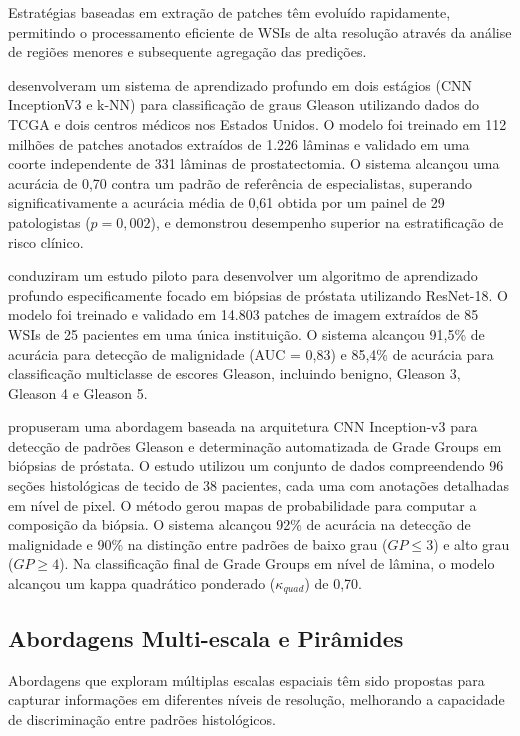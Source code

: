Estratégias baseadas em extração de patches têm evoluído rapidamente, permitindo o processamento eficiente de WSIs de alta resolução através da análise de regiões menores e subsequente agregação das predições.

\cite{ref-nagpal2019} desenvolveram um sistema de aprendizado profundo em dois estágios (CNN InceptionV3 e k-NN) para classificação de graus Gleason utilizando dados do TCGA e dois centros médicos nos Estados Unidos. O modelo foi treinado em 112 milhões de patches anotados extraídos de 1.226 lâminas e validado em uma coorte independente de 331 lâminas de prostatectomia. O sistema alcançou uma acurácia de 0,70 contra um padrão de referência de especialistas, superando significativamente a acurácia média de 0,61 obtida por um painel de 29 patologistas ($p = 0,002$), e demonstrou desempenho superior na estratificação de risco clínico.

\cite{ref-kott2019} conduziram um estudo piloto para desenvolver um algoritmo de aprendizado profundo especificamente focado em biópsias de próstata utilizando ResNet-18. O modelo foi treinado e validado em 14.803 patches de imagem extraídos de 85 WSIs de 25 pacientes em uma única instituição. O sistema alcançou 91,5\% de acurácia para detecção de malignidade (AUC = 0,83) e 85,4\% de acurácia para classificação multiclasse de escores Gleason, incluindo benigno, Gleason 3, Gleason 4 e Gleason 5.

\cite{ref-lucas2019} propuseram uma abordagem baseada na arquitetura CNN Inception-v3 para detecção de padrões Gleason e determinação automatizada de Grade Groups em biópsias de próstata. O estudo utilizou um conjunto de dados compreendendo 96 seções histológicas de tecido de 38 pacientes, cada uma com anotações detalhadas em nível de pixel. O método gerou mapas de probabilidade para computar a composição da biópsia. O sistema alcançou 92\% de acurácia na detecção de malignidade e 90\% na distinção entre padrões de baixo grau ($GP \le 3$) e alto grau ($GP \ge 4$). Na classificação final de Grade Groups em nível de lâmina, o modelo alcançou um kappa quadrático ponderado ($\kappa_{quad}$) de 0,70.

\subsection{Abordagens Multi-escala e Pirâmides}

Abordagens que exploram múltiplas escalas espaciais têm sido propostas para capturar informações em diferentes níveis de resolução, melhorando a capacidade de discriminação entre padrões histológicos.

